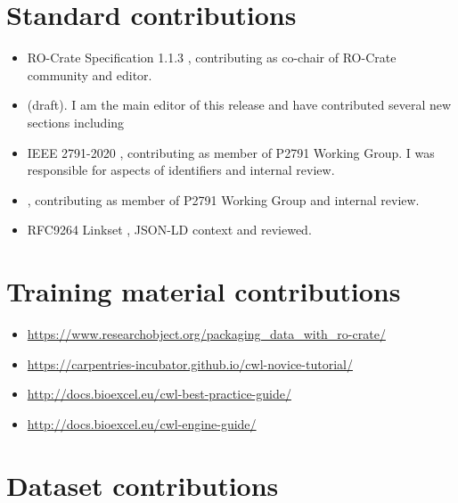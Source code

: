 \section{Standard contributions}
\begin{itemize}
  \item RO-Crate Specification 1.1.3 \cite{rocrate1.1}, contributing as co-chair of RO-Crate community and editor.
  \item {} (draft). I am the main editor of this release and have contributed several new sections including 
  \item IEEE 2791-2020 \cite{ch5-64}, contributing as member of P2791 Working Group. I was responsible for aspects of identifiers and internal review.
  \item {}, contributing as member of P2791 Working Group and internal review.
  \item RFC9264 Linkset \cite{RFC9264},  JSON-LD context and reviewed.
\end{itemize}

\section{Training material contributions}
\begin{itemize}
  \item \url{https://www.researchobject.org/packaging_data_with_ro-crate/}
  \item \url{https://carpentries-incubator.github.io/cwl-novice-tutorial/}
  \item \url{http://docs.bioexcel.eu/cwl-best-practice-guide/}
  \item \url{http://docs.bioexcel.eu/cwl-engine-guide/}
\end{itemize}



\section{Dataset contributions}

